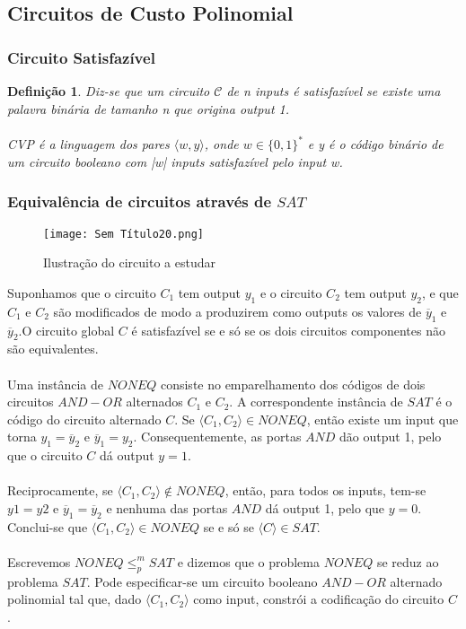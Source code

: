 \documentclass[10pt,a4paper]{report}
\newtheorem{definition}{Definição}
\begin{document}
\subsection{Circuitos de Custo Polinomial}
\subsubsection{Circuito Satisfazível}
\begin{definition}
Diz-se que um circuito $\mathcal{C}$ de n inputs é satisfazível se existe uma palavra binária de tamanho n que origina output 1.\\
\\
CVP é a linguagem dos pares $\langle w, y\rangle$, onde $w \in \{0, 1\}^*$ e y é o código binário de um circuito booleano com |w| inputs satisfazível pelo input w.
\end{definition}
\subsubsection{Equivalência de circuitos através de $SAT$}
\begin{figure}[H]
\centering
\texttt{[image: Sem Título20.png]}
\caption{Ilustração do circuito a estudar}
\end{figure}
Suponhamos que o circuito $C_1$ tem output $y_1$ e o circuito $C_2$ tem output $y_2$, e que $C_1$ e $C_2$ são modificados de modo a produzirem como outputs os valores de $\overline{y}_1$ e $\overline{y}_2$.O circuito global $C$ é satisfazível se e só se os dois circuitos componentes não são equivalentes.\\
\\
Uma instância de $NONEQ$ consiste no emparelhamento dos códigos de dois circuitos $AND-OR$ alternados $C_1$ e $C_2$. A correspondente instância de $SAT$ é o código do circuito alternado $C$. Se $\langle C_1, C_2\rangle \in NONEQ$, então existe um input que torna $y_1 = \overline{y}_2$ e $\overline{y}_1 = y_2$. Consequentemente, as portas $AND$ dão output 1, pelo que o circuito $C$ dá output $y = 1$.\\
\\
Reciprocamente, se $\langle C_1, C_2\rangle \notin NONEQ$, então, para todos os inputs, tem-se $y1 = y2$ e $\overline{y}_1 = \overline{y}_2$ e nenhuma das portas $AND$ dá output 1, pelo que $y = 0$. Conclui-se que $\langle C_1, C_2\rangle \in NONEQ$ se e só se $\langle C\rangle \in SAT$.\\
\\
Escrevemos $NONEQ \leq_p^m SAT$ e dizemos que o problema $NONEQ$ se reduz ao problema $SAT$. Pode especificar-se um circuito booleano $AND-OR$ alternado polinomial tal que, dado $\langle C_1, C_2\rangle$ como input, constrói a codificação do circuito $C$.
\end{document}
